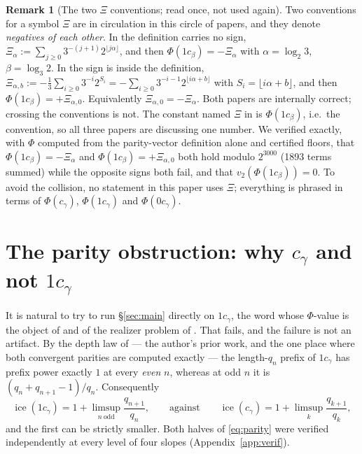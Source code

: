 \documentclass[11pt,reqno]{amsart}
\theoremstyle{plain}
\theoremstyle{definition}
\newtheorem{remark}[theorem]{Remark}
\DeclareMathOperator{\ice}{ice}
\newcommand{\PH}{\Phi}
\newcommand{\vtwo}{v_2}
\begin{document}
\begin{remark}[The two $\Xi$ conventions; read once, not used again]\label{rem:xi}
Two conventions for a symbol $\Xi$ are in circulation in this circle of papers, and they denote
\emph{negatives of each other}. In \cite[Proposition 3.2]{DJirr} the definition carries no sign,
$\Xi_\alpha:=\sum_{j\ge0}3^{-(j+1)}2^{\lfloor j\alpha\rfloor}$, and then
$\PH(1c_\beta)=-\Xi_\alpha$ with $\alpha=\log_2 3$, $\beta=\log_3 2$. In
\cite[Theorem 4.1]{DJedge} the sign is inside the definition,
$\Xi_{\alpha,b}:=-\frac13\sum_{i\ge0}3^{-i}2^{S_i}=-\sum_{i\ge0}3^{-i-1}2^{\lfloor i\alpha+b\rfloor}$
with $S_i=\lfloor i\alpha+b\rfloor$, and then $\PH(1c_\beta)=+\Xi_{\alpha,0}$. Equivalently
$\Xi_{\alpha,0}=-\Xi_\alpha$. Both papers are internally correct; crossing the conventions is not. The constant named $\Xi$
in \cite[Theorem 4.4]{Allikvere26} is $\PH(1c_\beta)$, i.e.\ the \cite{DJedge} convention, so
all three papers are discussing one number.
We verified exactly, with $\PH$ computed from the parity-vector definition alone and certified
floors, that $\PH(1c_\beta)=-\Xi_\alpha$ and $\PH(1c_\beta)=+\Xi_{\alpha,0}$ both hold modulo
$2^{3000}$ (1893 terms summed) while the opposite signs both fail, and that
$\vtwo(\PH(1c_\beta))=0$. To avoid the collision, no statement in this paper uses $\Xi$; everything
is phrased in terms of $\PH(c_\gamma)$, $\PH(1c_\gamma)$ and $\PH(0c_\gamma)$.
\end{remark}

\section{The parity obstruction: why \texorpdfstring{$c_\gamma$}{c-gamma} and not
\texorpdfstring{$1c_\gamma$}{1c-gamma}}\label{sec:parity}

It is natural to try to run \S\ref{sec:main} directly on $1c_\gamma$, the word whose $\PH$-value is
the object of \cite{DJirr} and of the realizer problem of \cite{DJedge}. That fails, and the failure
is not an artifact. By the depth law of \cite[Theorems 5.3 and 8.3]{DJirr} --- the author's prior work, and the
one place where both convergent parities are computed exactly --- the length-$q_n$ prefix of
$1c_\gamma$ has prefix power exactly $1$ at every \emph{even} $n$, whereas at odd $n$ it is
$(q_n+q_{n+1}-1)/q_n$. Consequently
\begin{equation}\label{eq:parity}
  \ice(1c_\gamma)=1+\limsup_{n\ \mathrm{odd}}\frac{q_{n+1}}{q_n},
  \qquad\text{against}\qquad
  \ice(c_\gamma)=1+\limsup_{k}\frac{q_{k+1}}{q_k},
\end{equation}
and the first can be strictly smaller. Both halves of \eqref{eq:parity} were verified
independently at every level of four slopes (Appendix~\ref{app:verif}).
\end{document}
